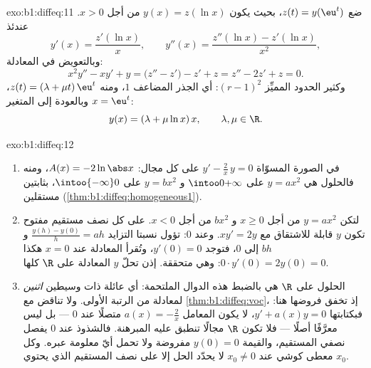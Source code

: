 \begin{solution}{exo:b1:diffeq:11}
ضع $z(t) = y(\eu^t)$، بحيث يكون $y(x) = z(\ln x)$ من أجل $x > 0$. عندئذ
\[
y'(x) = \frac{z'(\ln x)}x,
\qquad
y''(x) = \frac{z''(\ln x) - z'(\ln x)}{x^2} ,
\]
وبالتعويض في المعادلة:
\[
x^2y'' - xy' + y = \bigl(z'' - z'\bigr) - z' + z
= z'' - 2z' + z = 0 .
\]
وكثير الحدود المميِّز $(r - 1)^2$: أي الجذر المضاعف $1$، ومنه $z(t) =
(\lambda + \mu t)\,\eu^t$، وبالعودة إلى المتغير $x = \eu^t$:
\[
y(x) = (\lambda + \mu\ln x)\,x,
\qquad \lambda, \mu \in \R .
\]
\end{solution}

\begin{solution}{exo:b1:diffeq:12}
\begin{enumerate}
  \item في الصورة المسوّاة $y' - \frac2x\,y = 0$ على كل مجال:
        $A(x) = -2\ln\abs x$، ومنه فالحلول هي $y = a x^2$ على
        $\intoo0{+\infty}$ و $y = b x^2$ على $\intoo{-\infty}0$،
        بثابتين مستقلين
        (\cref{thm:b1:diffeq:homogeneous1}).
  \item لتكن $y = ax^2$ من أجل $x \geq 0$ و $bx^2$ من أجل $x < 0$. على
        كل نصف مستقيم مفتوح تكون $y$ قابلة للاشتقاق مع $xy' = 2y$.
        وعند $0$: تؤول نسبتا التزايد $\frac{y(h) - y(0)}h =
        ah$ و $bh$ إلى $0$، فتوجد $y'(0) = 0$، وتُقرأ
        المعادلة عند $x = 0$ هكذا $0 \cdot y'(0) = 2y(0) = 0$:
        وهي متحققة. إذن تحلّ $y$ المعادلة على $\R$ كلها.
  \item الحلول على $\R$ هي بالضبط هذه الدوال الملتحمة: أي
        عائلة ذات وسيطين \emph{اثنين} لمعادلة من الرتبة الأولى.
        ولا تناقض مع \cref{thm:b1:diffeq:voc}،
        إذ تخفق فروضها هنا: فبكتابتها $y' + a(x)y = 0$،
        لا يكون المعامل $a(x) = -\frac2x$ متصلًا عند $0$
        --- بل ليس معرَّفًا أصلًا --- فلا تكون $\R$ مجالًا
        تنطبق عليه المبرهنة. فالشذوذ عند $0$
        يفصل نصفي المستقيم، والقيمة $y(0) = 0$
        مفروضة ولا تحمل أيّ معلومة عبره. وكل معطى
        كوشي عند $x_0 \neq 0$ لا يحدّد الحل إلا على
        نصف المستقيم الذي يحتوي $x_0$.
\end{enumerate}
\end{solution}

